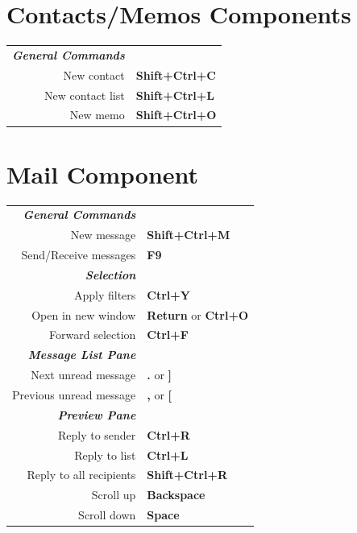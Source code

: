 \documentclass[12pt]{article}
\begin{document}
\begin{landscape}
\begin{center}
\begin{multicols}{2}
	\section*{Contacts/Memos Components}
	\begin{tabular*}{4in}{rp{1.5in}}
		\textit{\textbf{General Commands}}	&					\\
		New contact				& \textbf{Shift+Ctrl+C}			\\
		New contact list			& \textbf{Shift+Ctrl+L}			\\
		New memo				& \textbf{Shift+Ctrl+O}			\\
	\end{tabular*}
	\section*{Mail Component}
	\begin{tabular*}{4in}{rp{1.5in}}
		\textit{\textbf{General Commands}}	&					\\
		New message				& \textbf{Shift+Ctrl+M}			\\
		\vspace{1.5mm}
		Send/Receive messages			& \textbf{F9}				\\
		\textit{\textbf{Selection}}		&					\\
		Apply filters				& \textbf{Ctrl+Y}			\\
		Open in new window 			& \textbf{Return} or \textbf{Ctrl+O}	\\
		\vspace{1.5mm}
		Forward selection			& \textbf{Ctrl+F}			\\
		\textit{\textbf{Message List Pane}}	&					\\
		Next unread message			& \textbf{.} or \textbf{]}		\\
		\vspace{1.5mm}
		Previous unread message			& \textbf{,} or \textbf{[}		\\
		\textit{\textbf{Preview Pane}}		&					\\
		Reply to sender				& \textbf{Ctrl+R}			\\
		Reply to list				& \textbf{Ctrl+L}			\\
		Reply to all recipients 		& \textbf{Shift+Ctrl+R}			\\
		Scroll up				& \textbf{Backspace}			\\
		Scroll down				& \textbf{Space}			\\
	\end{tabular*}

\end{multicols}
\end{center}
\end{landscape}
\end{document}
